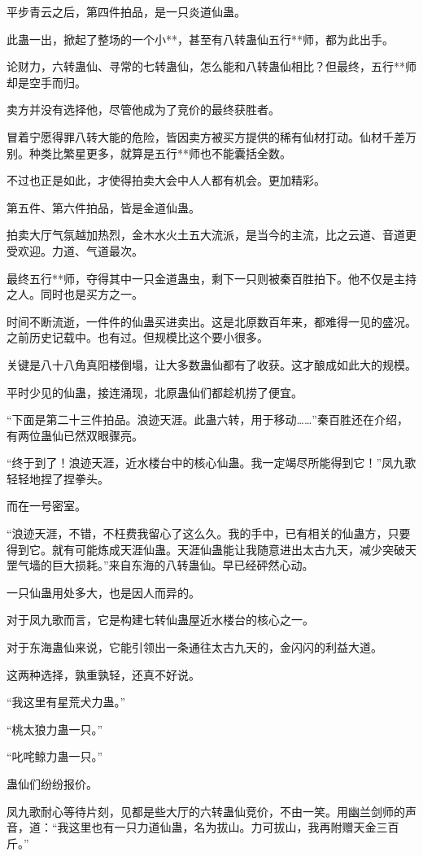 \begin{this_body}
平步青云之后，第四件拍品，是一只炎道仙蛊。

此蛊一出，掀起了整场的一个小**，甚至有八转蛊仙五行**师，都为此出手。

论财力，六转蛊仙、寻常的七转蛊仙，怎么能和八转蛊仙相比？但最终，五行**师却是空手而归。

卖方并没有选择他，尽管他成为了竞价的最终获胜者。

冒着宁愿得罪八转大能的危险，皆因卖方被买方提供的稀有仙材打动。仙材千差万别。种类比繁星更多，就算是五行**师也不能囊括全数。

不过也正是如此，才使得拍卖大会中人人都有机会。更加精彩。

第五件、第六件拍品，皆是金道仙蛊。

拍卖大厅气氛越加热烈，金木水火土五大流派，是当今的主流，比之云道、音道更受欢迎。力道、气道最次。

最终五行**师，夺得其中一只金道蛊虫，剩下一只则被秦百胜拍下。他不仅是主持之人。同时也是买方之一。

时间不断流逝，一件件的仙蛊买进卖出。这是北原数百年来，都难得一见的盛况。之前历史记载中。也有过。但规模比这个要小很多。

关键是八十八角真阳楼倒塌，让大多数蛊仙都有了收获。这才酿成如此大的规模。

平时少见的仙蛊，接连涌现，北原蛊仙们都趁机捞了便宜。

“下面是第二十三件拍品。浪迹天涯。此蛊六转，用于移动……”秦百胜还在介绍，有两位蛊仙已然双眼骤亮。

“终于到了！浪迹天涯，近水楼台中的核心仙蛊。我一定竭尽所能得到它！”凤九歌轻轻地捏了捏拳头。

而在一号密室。

“浪迹天涯，不错，不枉费我留心了这么久。我的手中，已有相关的仙蛊方，只要得到它。就有可能炼成天涯仙蛊。天涯仙蛊能让我随意进出太古九天，减少突破天罡气墙的巨大损耗。”来自东海的八转蛊仙。早已经砰然心动。

一只仙蛊用处多大，也是因人而异的。

对于凤九歌而言，它是构建七转仙蛊屋近水楼台的核心之一。

对于东海蛊仙来说，它能引领出一条通往太古九天的，金闪闪的利益大道。

这两种选择，孰重孰轻，还真不好说。

“我这里有星荒犬力蛊。”

“桃太狼力蛊一只。”

“叱咤鲸力蛊一只。”

蛊仙们纷纷报价。

凤九歌耐心等待片刻，见都是些大厅的六转蛊仙竞价，不由一笑。用幽兰剑师的声音，道：“我这里也有一只力道仙蛊，名为拔山。力可拔山，我再附赠天金三百斤。”


\end{this_body}
